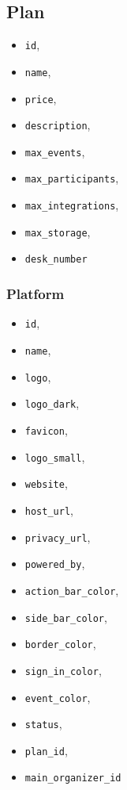 \subsection{Plan}
\begin{itemize}
	\item \verb|id|,
	\item \verb|name|,
	\item \verb|price|,
	\item \verb|description|,
	\item \verb|max_events|,
	\item \verb|max_participants|,
	\item \verb|max_integrations|,
	\item \verb|max_storage|,
	\item \verb|desk_number|
\end{itemize}

\subsubsection{Platform}
\begin{itemize}
	\item \verb|id|,
	\item \verb|name|,
	\item \verb|logo|,
	\item \verb|logo_dark|,
	\item \verb|favicon|,
	\item \verb|logo_small|,
	\item \verb|website|,
	\item \verb|host_url|,
	\item \verb|privacy_url|,
	\item \verb|powered_by|,
	\item \verb|action_bar_color|,
	\item \verb|side_bar_color|,
	\item \verb|border_color|,
	\item \verb|sign_in_color|,
	\item \verb|event_color|,
	\item \verb|status|,
	\item \verb|plan_id|,
	\item \verb|main_organizer_id|
\end{itemize}

